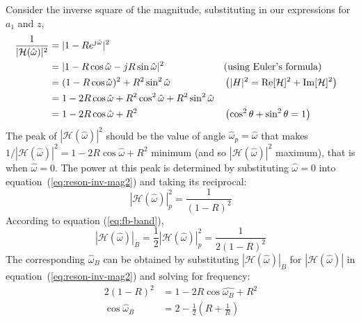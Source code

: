Consider the inverse square of the magnitude, substituting in our
expressions for $a_1$ and $z$,
\begin{align}
\frac{1}{|\mathcal{H}(\hat{\omega})|^2}
    &= |1-R e^{j\hat{\omega}}|^2 \notag\\
    &= |1 - R\cos\hat{\omega} - jR\sin\hat{\omega}|^2 
    &&\text{(using Euler's formula)}
    \notag\\
    &= (1 - R\cos\hat{\omega})^2 + R^2\sin^2\hat{\omega} 
    &&\left(|H|^2 = \operatorname{Re}[\mathcal{H}]^2 + \operatorname{Im}[\mathcal{H}]^2\right)
    \notag\\
    &= 1 - 2R\cos\hat{\omega} +R^2\cos^2\hat{\omega} +
       R^2\sin^2\hat{\omega} \notag\\ 
    &= 1-2R\cos\hat{\omega} + R^2
    &&\left(\cos^2\theta + \sin^2\theta = 1\right)
    \label{eq:reson-inv-mag2}
\end{align}
The peak of $|\mathcal{H}(\hat{\omega})|^2$ should be the value of
angle $\hat{\omega}_p=\hat{\omega}$ that makes
$1/|\mathcal{H}(\hat{\omega})|^2=1-2R\cos\hat{\omega} + R^2$ minimum
(and so $|\mathcal{H}(\hat{\omega})|^2$ maximum),
that is when $\hat{\omega}=0$. The power at this peak is determined by
substituting $\hat{\omega}=0$ into equation~(\ref{eq:reson-inv-mag2})
and taking its reciprocal:
\begin{equation}
|\mathcal{H}(\hat{\omega})|^2_p=\frac{1}{(1-R)^2}
\end{equation}
According to equation (\ref{eq:fb-band}), 
\begin{equation}
|\mathcal{H}(\hat{\omega})|_B
  =\frac{1}{2}|\mathcal{H}(\hat{\omega})|^2_p=\frac{1}{2(1-R)^2}
\end{equation}
The corresponding $\hat{\omega}_B$ can be obtained by substituting
$|\mathcal{H}(\hat{\omega})|_B$ for $|\mathcal{H}(\hat{\omega})|$ in
equation~(\ref{eq:reson-inv-mag2}) and solving for frequency:
\begin{align}
2(1-R)^2 &= 1-2R\cos\hat{\omega_B}+R^2 \label{eq:fb-band2a}\\
\cos\hat{\omega}_B &= 2-\frac{1}{2}\left(R+\frac{1}{R}\right)
\label{eq:fb-band2b}
\end{align} 

